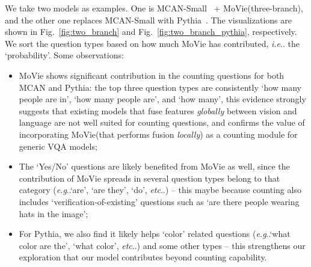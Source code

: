 \documentclass{article} \usepackage[dvipsnames,table]{xcolor}
\makeatletter
\def\vs{{\bm{s}}}
\newcommand{\ours}[0]{MoVie\xspace}
\DeclareRobustCommand\onedot{\futurelet\@let@token\@onedot}
\def\@onedot{\ifx\@let@token.\else.\null\fi\xspace}
\def\eg{\emph{e.g}\onedot} \def\Eg{\emph{E.g}\onedot}
\def\ie{\emph{i.e}\onedot} \def\Ie{\emph{I.e}\onedot}
\def\etc{\emph{etc}\onedot} \def\vs{\emph{vs}\onedot}
\makeatother
\begin{document}
We take two models as examples. One is MCAN-Small~\cite{yu2019deep} + \ours (three-branch), and the other one replaces MCAN-Small with Pythia~\cite{jiang2018pythia}. The visualizations are shown in Fig.~\ref{fig:two_branch} and Fig.~\ref{fig:two_branch_pythia}, respectively. We sort the question types based on how much \ours has contributed, \ie the `probability'. Some observations:
\begin{itemize}
    \item \ours shows significant contribution in the counting questions for both MCAN and Pythia: the top three question types are consistently `how many people are in', `how many people are', and `how many', this evidence strongly suggests that existing models that fuse features \emph{globally} between vision and language are not well suited for counting questions, and confirms the value of incorporating \ours (that performs fusion \emph{locally}) as a counting module for generic VQA models;
    \item The `Yes/No' questions are likely benefited from \ours as well, since the contribution of \ours spreads in several question types belong to that category (\eg `are', `are they', `do', \etc) -- this maybe because counting also includes `verification-of-existing' questions such as `are there people wearing hats in the image';
    \item For Pythia, we also find it likely helps `color' related questions (\eg `what color are the', `what color', \etc) and some other types -- this strengthens our exploration that our model contributes beyond counting capability.
\end{itemize}



\end{document}
